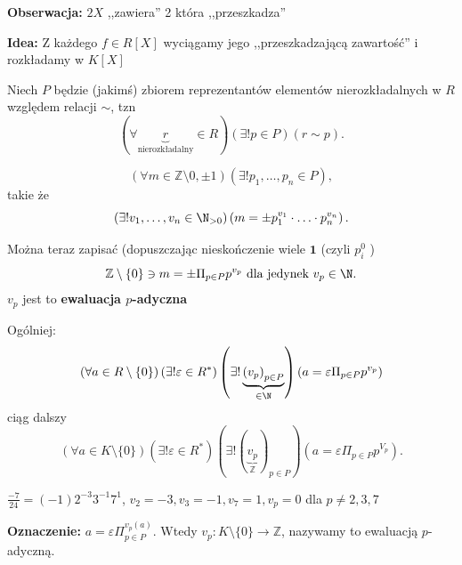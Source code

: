  \noindent \textbf{Obserwacja:} $2X$ ,,zawiera'' 2 która ,,przeszkadza'' 

 \noindent \textbf{Idea:} Z każdego $f\in R\left[ X \right] $ wyciągamy jego ,,przeszkadzającą zawartość'' i rozkładamy w $K\left[ X \right] $

Niech $P$ będzie (jakimś) zbiorem reprezentantów elementów nierozkładalnych w $R$ względem relacji $\sim  $, tzn
 \[
\left(\forall \underbrace{r}_{\text{nierozkładalny}} \in R\right) \left(\exists ! p \in P \right) \left( r\sim p  \right) 
.\] 
\begin{eg}
	\[
	\left(\forall m\in \mathbb{Z} \setminus 0, \pm 1 \right)\left(\exists ! p_1,\ldots,p_{n}\in P \right)  
	,\] 
	takie że
	\[
	\left(\exists ! v_1,\ldots,v_{n} \in \N_{>0} \right)\left( m=\pm p_1^{v_1}\cdot \ldots \cdot p_{n}^{v_{n}} \right)  
	.\] 
\end{eg} 

Można teraz zapisać (dopuszczając nieskończenie wiele $\mathbf{1}$ (czyli $p_{i}^{0}$ )
\[
\mathbb{Z} \setminus \{0\} \ni m = \pm \Pi_{p \in P} p ^{v_{p}} \text{ dla jedynek $v_{p}\in \N$}
.\] 
$v_{p}$ jest to \textbf{ewaluacja $p$-adyczna}  

Ogólniej:
\[
\left(\forall a\in R\setminus \{0\}  \right)\left(\exists ! \varepsilon \in R^{\ast}  \right)\left(\exists ! \underbrace{\left( v_{p} \right)_{p\in P} }_{\in \N} \right)\left( a = \varepsilon \Pi_{p\in P} p^{v_{p}}\right)\] 
ciąg dalszy
\[\left(\forall a \in K\setminus \{0\}  \right)\left(\exists ! \varepsilon \in R^{\ast}  \right)  \left(\exists ! \left( \underbrace{v_{p}}_{\mathbb{Z} } \right)_{p\in P} \right)\left( a = \varepsilon \Pi _{p\in P} p^{V_{p}} \right)     
.\] 

\begin{eg}
	$\frac{-7}{24} = \left( -1 \right) 2^{-3}3^{-1}7^{1}$, $v_{2} = -3, v_3 = -1, v_7 = 1, v_{p} = 0$ dla $p\neq 2,3,7$
\end{eg} 

\noindent \textbf{Oznaczenie:} $a = \varepsilon \Pi_{p \in P}^{v_{p}(a)}$. Wtedy $v_{p}: K\setminus \{0\} \to \mathbb{Z} $, nazywamy to ewaluacją $p$-adyczną.

